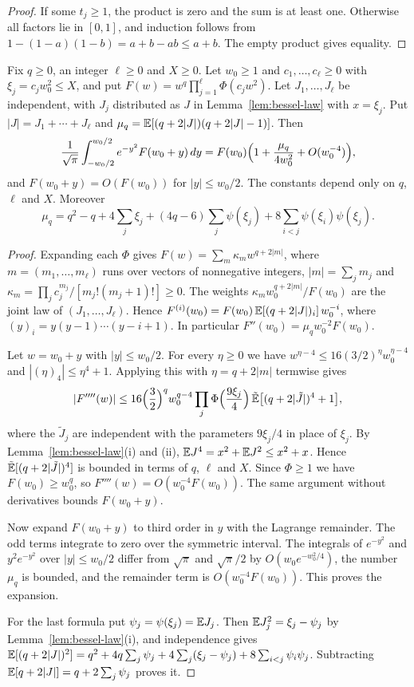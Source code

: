 \begin{proof}
If some $t_j\ge1$, the product is zero and the sum is at least one. Otherwise all
factors lie in $[0,1]$, and induction follows from
$1-(1-a)(1-b)=a+b-ab\le a+b$. The empty product gives equality.
\end{proof}

\begin{lemma}\label{lem:gaussian-phi-average}
Fix $q\ge0$, an integer $\ell\ge0$ and $X\ge0$. Let $w_0\ge1$ and
$c_1,\ldots,c_\ell\ge0$ with $\xi_j=c_jw_0^2\le X$, and put
$F(w)=w^q\prod_{j=1}^\ell\Phi(c_jw^2)$. Let $J_1,\ldots,J_\ell$ be independent,
with $J_j$ distributed as $J$ in Lemma~\ref{lem:bessel-law} with $x=\xi_j$. Put
$|J|=J_1+\cdots+J_\ell$ and $\mu_q=\mathbb E[(q+2|J|)(q+2|J|-1)]$. Then
\[
\frac1{\sqrt\pi}\int_{-w_0/2}^{w_0/2}e^{-y^2}F(w_0+y)\,dy
=F(w_0)\Bigl(1+\frac{\mu_q}{4w_0^2}+O(w_0^{-4})\Bigr),
\]
and $F(w_0+y)=O(F(w_0))$ for $|y|\le w_0/2$. The constants depend only on $q$,
$\ell$ and $X$. Moreover
\[
\mu_q=q^2-q+4\sum_j\xi_j+(4q-6)\sum_j\psi(\xi_j)
+8\sum_{i<j}\psi(\xi_i)\psi(\xi_j).
\]
\end{lemma}

\begin{proof}
Expanding each $\Phi$ gives $F(w)=\sum_m\kappa_mw^{q+2|m|}$, where
$m=(m_1,\ldots,m_\ell)$ runs over vectors of nonnegative integers, $|m|=\sum_jm_j$
and $\kappa_m=\prod_jc_j^{m_j}/[m_j!(m_j+1)!]\ge0$. The weights
$\kappa_mw_0^{q+2|m|}/F(w_0)$ are the joint law of $(J_1,\ldots,J_\ell)$. Hence
$F^{(i)}(w_0)=F(w_0)\,\mathbb E[(q+2|J|)_i]\,w_0^{-i}$, where
$(y)_i=y(y-1)\cdots(y-i+1)$. In particular $F''(w_0)=\mu_qw_0^{-2}F(w_0)$.

Let $w=w_0+y$ with $|y|\le w_0/2$. For every $\eta\ge0$ we have
$w^{\eta-4}\le16(3/2)^\eta w_0^{\eta-4}$ and $|(\eta)_4|\le\eta^4+1$. Applying this
with $\eta=q+2|m|$ termwise gives
\[
|F''''(w)|\le16\Bigl(\frac32\Bigr)^qw_0^{q-4}
\prod_j\Phi\Bigl(\frac{9\xi_j}4\Bigr)\,
\tilde{\mathbb E}\bigl[(q+2|\tilde J|)^4+1\bigr],
\]
where the $\tilde J_j$ are independent with the parameters $9\xi_j/4$ in place of
$\xi_j$. By Lemma~\ref{lem:bessel-law}(i) and (ii),
$\mathbb E J^4=x^2+\mathbb E J^2\le x^2+x$. Hence $\tilde{\mathbb E}[(q+2|\tilde J|)^4]$ is bounded in
terms of $q$, $\ell$ and $X$. Since $\Phi\ge1$ we have $F(w_0)\ge w_0^q$, so
$F''''(w)=O(w_0^{-4}F(w_0))$. The same argument without derivatives bounds
$F(w_0+y)$.

Now expand $F(w_0+y)$ to third order in $y$ with the Lagrange remainder. The odd
terms integrate to zero over the symmetric interval. The integrals of $e^{-y^2}$
and $y^2e^{-y^2}$ over $|y|\le w_0/2$ differ from $\sqrt\pi$ and $\sqrt\pi/2$ by
$O(w_0e^{-w_0^2/4})$, the number $\mu_q$ is bounded, and the remainder term is
$O(w_0^{-4}F(w_0))$. This proves the expansion.

For the last formula put $\psi_j=\psi(\xi_j)=\mathbb E J_j$. Then
$\mathbb E J_j^2=\xi_j-\psi_j$ by Lemma~\ref{lem:bessel-law}(i), and independence gives
$\mathbb E[(q+2|J|)^2]=q^2+4q\sum_j\psi_j+4\sum_j(\xi_j-\psi_j)+8\sum_{i<j}\psi_i\psi_j$.
Subtracting $\mathbb E[q+2|J|]=q+2\sum_j\psi_j$ proves it.
\end{proof}

